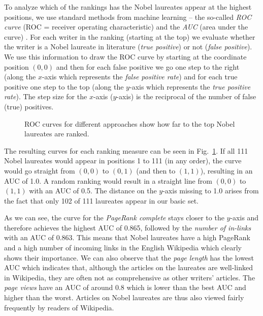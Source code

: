 \documentclass[a4paper,12pt]{scrartcl}
\begin{document}
%
To analyze which of the rankings has the Nobel laureates appear at the
highest positions, we use standard methods from machine learning --
the so-called \emph{ROC curve} (ROC = receiver operating
characteristic) and the \emph{AUC} (area under the curve)
\cite{fawcett2006introduction}. For each writer in the ranking
(starting at the top) we evaluate whether the writer is a Nobel
laureate in literature (\emph{true positive}) or not (\emph{false
  positive}). We use this information to draw the ROC curve by
starting at the coordinate position $(0,0)$ and then for each false
positive we go one step to the right (along the $x$-axis which
represents the \emph{false positive rate}) and for each true positive
one step to the top (along the $y$-axis which represents the
\emph{true positive rate}). %
  The step size for the $x$-axis
  ($y$-axis) is the reciprocal of the number of false (true)
  positives. %
%
\begin{figure}
  \centering
  \caption{ROC curves for different approaches show how far to the top Nobel laureates are ranked.}
  \label{fig:roc}
\end{figure}
%
The resulting curves for each ranking measure can be seen in
Fig.~\ref{fig:roc}.
%
%
If all 111 Nobel laureates would appear in positions 1 to 111 (in any
order), the curve would go straight from $(0,0)$ to $(0,1)$ (and
then to $(1,1)$), resulting in
an AUC of 1.0. A random ranking would result in a straight line from
$(0,0)$ to $(1,1)$ with an AUC of 0.5.
%
The distance on the $y$-axis missing to 1.0 arises from the fact that
only 102 of 111 laureates appear in our basic set.

As we can see, the curve for the \emph{PageRank complete} stays closer
to the $y$-axis and therefore achieves the highest AUC of 0.865,
followed by the \emph{number of in-links} with an AUC of 0.863. This
means that Nobel laureates have a high PageRank and a high number of
incoming links in the English Wikipedia which clearly shows their
importance. We can also observe that the \emph{page length} has the
lowest AUC which indicates that, although the articles on the
laureates are well-linked in Wikipedia, they are often not as
comprehensive as other writers' articles. The \emph{page views} have
an AUC of around 0.8 which is lower than the best AUC and higher than
the worst. Articles on Nobel laureates are thus also viewed fairly
frequently by readers of Wikipedia.

\end{document}
